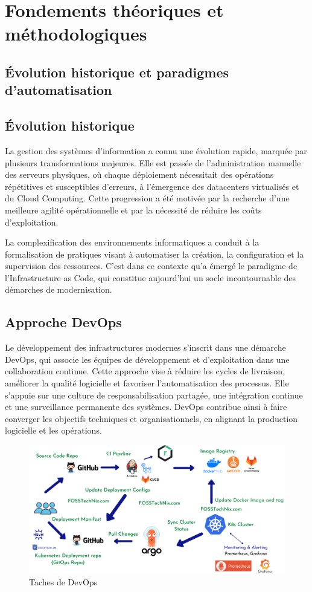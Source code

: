 \section{Fondements théoriques et méthodologiques}

\subsection{Évolution historique et paradigmes d'automatisation}

\subsection{Évolution historique}

La gestion des systèmes d’information a connu une évolution rapide, marquée par plusieurs transformations majeures. Elle est passée de l’administration manuelle des serveurs physiques, où chaque déploiement nécessitait des opérations répétitives et susceptibles d’erreurs, à l’émergence des datacenters virtualisés et du Cloud Computing. Cette progression a été motivée par la recherche d’une meilleure agilité opérationnelle et par la nécessité de réduire les coûts d’exploitation.

La complexification des environnements informatiques a conduit à la formalisation de pratiques visant à automatiser la création, la configuration et la supervision des ressources. C’est dans ce contexte qu’a émergé le paradigme de l’Infrastructure as Code, qui constitue aujourd’hui un socle incontournable des démarches de modernisation.

\subsection{Approche DevOps}

Le développement des infrastructures modernes s’inscrit dans une démarche DevOps, qui associe les équipes de développement et d’exploitation dans une collaboration continue. Cette approche vise à réduire les cycles de livraison, améliorer la qualité logicielle et favoriser l’automatisation des processus. Elle s’appuie sur une culture de responsabilisation partagée, une intégration continue et une surveillance permanente des systèmes. DevOps contribue ainsi à faire converger les objectifs techniques et organisationnels, en alignant la production logicielle et les opérations.

\begin{figure} [H]
	\centering
	\includegraphics[width=.5\textwidth]{figures/Devops.png}
	\caption{Taches de DevOps}
\end{figure}
